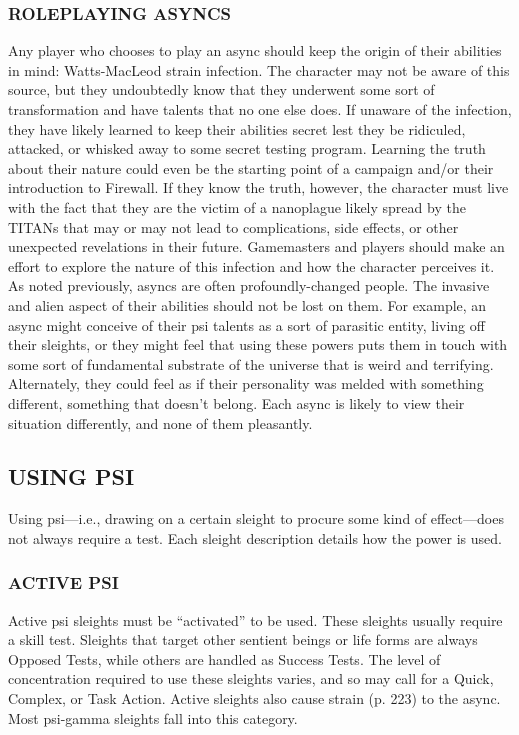 \subsubsection{ROLEPLAYING ASYNCS} 

Any player who chooses to play an async should keep the origin of their abilities in mind: Watts-MacLeod strain infection. The character may not be aware of this source, but they undoubtedly know that they underwent some sort of transformation and have talents that no one else does. If unaware of the infection, they have likely learned to keep their abilities secret lest they be ridiculed, attacked, or whisked away to some secret testing program. Learning the truth about their nature could even be the starting point of a campaign and/or their introduction to Firewall. If they know the truth, however, the character must live with the fact that they are the victim of a nanoplague likely spread by the TITANs that may or may not lead to complications, side effects, or other unexpected revelations in their future. Gamemasters and players should make an effort to explore the nature of this infection and how the character perceives it. As noted previously, asyncs are often profoundly-changed people. The invasive and alien aspect of their abilities should not be lost on them. For example, an async might conceive of their psi talents as a sort of parasitic entity, living off their sleights, or they might feel that using these powers puts them in touch with some sort of fundamental substrate of the universe that is weird and terrifying. Alternately, they could feel as if their personality was melded with something different, something that doesn’t belong. Each async is likely to view their situation differently, and none of them pleasantly. 

\subsection{USING PSI} 

Using psi—i.e., drawing on a certain sleight to procure some kind of effect—does not always require a test. Each sleight description details how the power is used. 

\subsubsection{ACTIVE PSI} 

Active psi sleights must be “activated” to be used. These sleights usually require a skill test. Sleights that target other sentient beings or life forms are always Opposed Tests, while others are handled as Success Tests. The level of concentration required to use these sleights varies, and so may call for a Quick, Complex, or Task Action. Active sleights also cause strain (p. 223) to the async. Most psi-gamma sleights fall into this category. 


